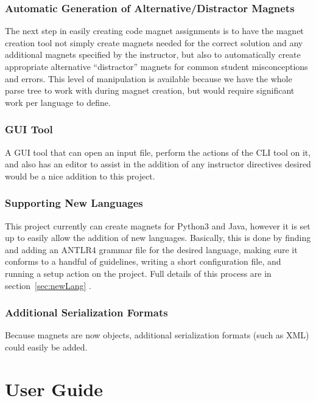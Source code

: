 \documentclass[letter,10pt]{article}
\begin{document}
\subsubsection{Automatic Generation of Alternative/Distractor Magnets}

The next step in easily creating code magnet assignments is to have the 
magnet creation tool not simply create magnets needed for the correct 
solution and any additional magnets specified by the instructor, but 
also to automatically create appropriate alternative ``distractor'' 
magnets for common student misconceptions and errors. This level of 
manipulation is available because we have the whole parse tree to work 
with during magnet creation, but would require significant work per 
language to define.

\subsubsection{GUI Tool}

A GUI tool that can open an input file, perform the actions of the CLI 
tool on it, and also has an editor to assist in the addition of any 
instructor directives desired would be a nice addition to this project.

\subsubsection{Supporting New Languages}

This project currently can create magnets for Python3 and Java, however 
it is set up to easily allow the addition of new languages. 
Basically, this is done by finding and adding an ANTLR4 grammar file 
for the desired language, making sure it conforms to a handful of 
guidelines, writing a short configuration file, and running a setup 
action on the project. Full details of this process are in 
section~\ref{sec:newLang} .


\subsubsection{Additional Serialization Formats}

Because magnets are now objects, additional serialization formats (such 
as XML) could easily be added. 



\section{User Guide}
\end{document}
